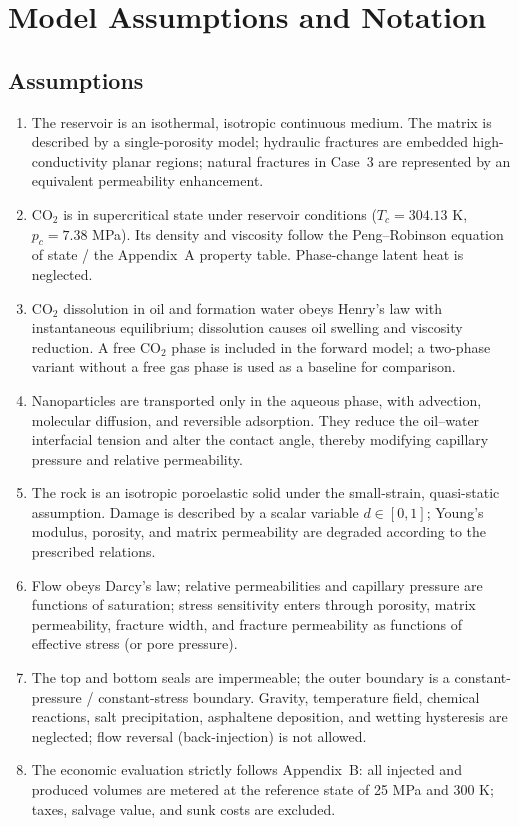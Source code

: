 \section{Model Assumptions and Notation}

\subsection{Assumptions}
\begin{enumerate}
\item The reservoir is an isothermal, isotropic continuous medium. The matrix is described
by a single-porosity model; hydraulic fractures are embedded high-conductivity planar
regions; natural fractures in Case~3 are represented by an equivalent permeability
enhancement.
\item CO$_2$ is in supercritical state under reservoir conditions
($T_c = 304.13$ K, $p_c = 7.38$ MPa). Its density and viscosity follow the
Peng--Robinson equation of state / the Appendix~A property table. Phase-change latent
heat is neglected.
\item CO$_2$ dissolution in oil and formation water obeys Henry's law with instantaneous
equilibrium; dissolution causes oil swelling and viscosity reduction. A free CO$_2$
phase is included in the forward model; a two-phase variant without a free gas phase is
used as a baseline for comparison.
\item Nanoparticles are transported only in the aqueous phase, with advection, molecular
diffusion, and reversible adsorption. They reduce the oil--water interfacial tension and
alter the contact angle, thereby modifying capillary pressure and relative permeability.
\item The rock is an isotropic poroelastic solid under the small-strain, quasi-static
assumption. Damage is described by a scalar variable $d \in [0,1]$; Young's modulus,
porosity, and matrix permeability are degraded according to the prescribed relations.
\item Flow obeys Darcy's law; relative permeabilities and capillary pressure are functions
of saturation; stress sensitivity enters through porosity, matrix permeability, fracture
width, and fracture permeability as functions of effective stress (or pore pressure).
\item The top and bottom seals are impermeable; the outer boundary is a constant-pressure /
constant-stress boundary. Gravity, temperature field, chemical reactions, salt
precipitation, asphaltene deposition, and wetting hysteresis are neglected; flow reversal
(back-injection) is not allowed.
\item The economic evaluation strictly follows Appendix~B: all injected and produced
volumes are metered at the reference state of 25 MPa and 300 K; taxes, salvage value,
and sunk costs are excluded.
\end{enumerate}

